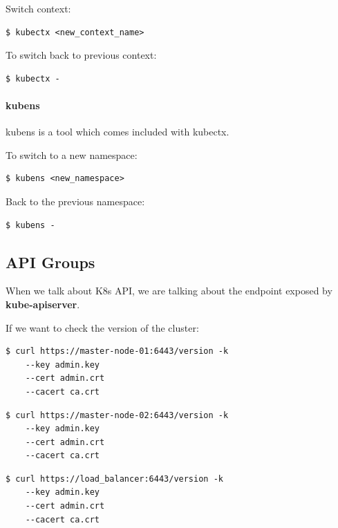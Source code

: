 \documentclass{article}
\newenvironment{codetemplate}[1][]{%
  \mybasecolorbox[#1]
  \itshape
}{%
  \endmybasecolorbox
}
\begin{document}
Switch context:
\begin{codetemplate}{}
\begin{verbatim}
$ kubectx <new_context_name>
\end{verbatim}
\end{codetemplate}

To switch back to previous context:
\begin{codetemplate}{}
\begin{verbatim}
$ kubectx -
\end{verbatim}
\end{codetemplate}

\paragraph{kubens}
kubens is a tool which comes included with kubectx.

To switch to a new namespace:
\begin{codetemplate}{}
\begin{verbatim}
$ kubens <new_namespace>
\end{verbatim}
\end{codetemplate}

Back to the previous namespace:
\begin{codetemplate}{}
\begin{verbatim}
$ kubens -
\end{verbatim}
\end{codetemplate}

\subsection{API Groups}
When we talk about K8s API, we are talking about the endpoint exposed by \textbf{kube-apiserver}.

If we want to check the version of the cluster:
\begin{codetemplate}{}
\begin{verbatim}
$ curl https://master-node-01:6443/version -k
    --key admin.key
    --cert admin.crt
    --cacert ca.crt
\end{verbatim}
\end{codetemplate}
\begin{codetemplate}{}
\begin{verbatim}
$ curl https://master-node-02:6443/version -k
    --key admin.key
    --cert admin.crt
    --cacert ca.crt
\end{verbatim}
\end{codetemplate}
\begin{codetemplate}{}
\begin{verbatim}
$ curl https://load_balancer:6443/version -k
    --key admin.key
    --cert admin.crt
    --cacert ca.crt
\end{verbatim}
\end{codetemplate}
\end{document}
